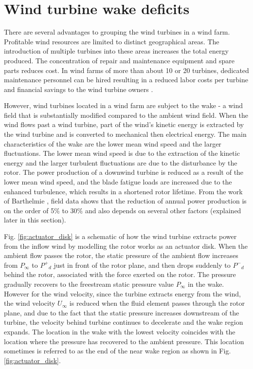 \documentclass{umthesis}
\begin{document}
\section{Wind turbine wake deficits}\label{sec:wake_review}
There are several advantages to grouping the wind turbines in a wind farm. Profitable wind resources are limited to distinct geographical areas. The introduction of multiple turbines into these areas increases the total energy produced. The concentration of repair and maintenance equipment and spare parts reduces cost. In wind farms of more than about 10 or 20 turbines, dedicated maintenance personnel can be hired resulting in a reduced labor costs per turbine and financial savings to the wind turbine owners \cite{WEE}.

However, wind turbines located in a wind farm are subject to the wake - a wind field that is substantially modified compared to the ambient wind field. When the wind flows past a wind turbine, part of the wind's kinetic energy is extracted by the wind turbine and is converted to mechanical then electrical energy. The main characteristics of the wake are the lower mean wind speed and the larger fluctuations. The lower mean wind speed is due to the extraction of the kinetic energy and the larger turbulent fluctuations are due to the disturbance by the rotor. The power production of a downwind turbine is reduced as a result of the lower mean wind speed, and the blade fatigue loads are increased due to the enhanced turbulence, which results in a shortened rotor lifetime. From the work of Barthelmie \cite{Meteorological_controls}\cite{Barthelmie_Evaluation}\cite{Ten_years}, field data shows that the reduction of annual power production is on the order of 5\% to 30\% and also depends on several other factors (explained later in this section).


Fig. \ref{fig:actuator_disk} is a schematic of how the wind turbine extracts power from the inflow wind by modelling the rotor works as an actuator disk. When the ambient flow passes the rotor, the static pressure of the ambient flow increases from $P_\infty$ to $P^+$$_d$ just in front of the rotor plane, and then drops suddenly to $P^-$$_d$ behind the rotor, associated with the force exerted on the rotor. The pressure gradually recovers to the freestream static pressure value $P_\infty$ in the wake. However for the wind velocity, since the turbine extracts energy from the wind, the wind velocity $U_\infty$ is reduced when the fluid element passes through the rotor plane, and due to the fact that the static pressure increases downstream of the turbine, the velocity behind turbine continues to decelerate and the wake region expands. The location in the wake with the lowest velocity coincides with the location where the pressure has recovered to the ambient pressure. This location sometimes is referred to as the end of the near wake region as shown in Fig. \ref{fig:actuator_disk}.
\end{document}
